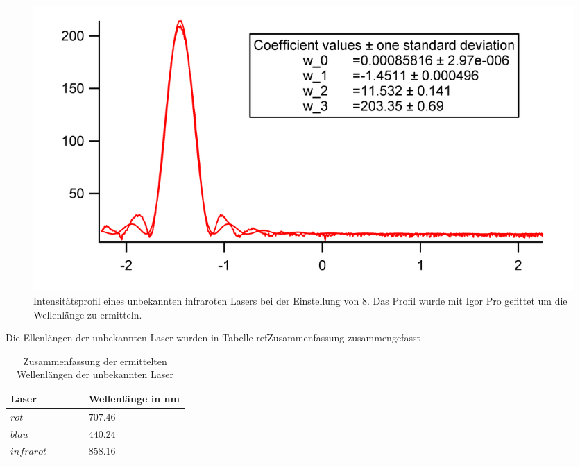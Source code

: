 \begin{figure}[H]	\centering	
	\begin{minipage}{1\textwidth}
		\includegraphics[width=\columnwidth]{180618/Graph_IR.png}
	\end{minipage}
	\caption{Intensitätsprofil eines unbekannten infraroten Lasers bei der Einstellung von $8$. Das Profil wurde mit Igor Pro gefittet um die Wellenlänge zu ermitteln. }
	\label{U_IR}
\end{figure}
Die Ellenlängen der unbekannten Laser wurden in Tabelle ref{Zusammenfassung} zusammengefasst
\begin{table}[H]
\centering
\label{Zusammenfassung}
	\caption{Zusammenfassung der ermittelten Wellenlängen der unbekannten Laser }
	\begin{tabular}{C{0.15\linewidth}|C{0.15\linewidth}}
		Laser & Wellenlänge in nm\\
		\hline \addlinespace[1ex] 
		$ rot $ & $707.46$\\
		$ blau $ & $440.24$\\
		$ infrarot $ & $858.16$\\
	\end{tabular}
\end{table}



%
